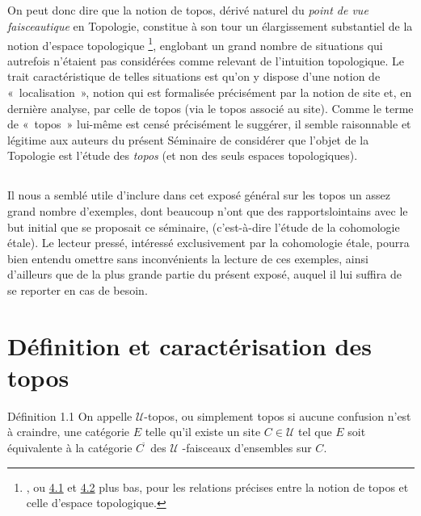 \documentclass[10pt]{../fichiers-configuration-latex/smfart}
\begin{document}
\subsection{}
On peut donc dire que la notion de topos, dérivé naturel du
\emph{point de vue faisceautique} en Topologie, constitue à son
tour un élargissement substantiel de la notion  d'espace
topologique \footnote[1]{\Cf [9], ou \hyperref[IV.subsec4.1]{4.1} et
\hyperref[IV.subsec4.2]{4.2} plus bas, pour les relations
  précises entre la notion de topos et celle d'espace
  topologique.}, englobant un grand nombre de situations qui
autrefois n'étaient pas considérées comme relevant de
l'intuition topologique. Le trait caractéristique de telles
situations est qu'on y dispose d'une notion de « localisation »,
notion qui est formalisée précisément par la notion de site
et, en dernière analyse, par celle de topos (via le topos
associé au site). Comme le terme de « topos »  lui-même est
censé précisément le suggérer, il semble raisonnable et
légitime aux auteurs du présent Séminaire de considérer que
l'objet de la Topologie est l'étude des \emph{topos} (et non des
seuls espaces topologiques).

\subsection{}
Il nous a semblé utile d'inclure dans cet exposé général sur
les topos un assez grand nombre d'exemples, dont beaucoup n'ont que
des rapports\pageoriginale lointains avec le but initial que se
proposait ce séminaire, (c'est-à-dire l'étude de la
cohomologie étale). Le lecteur pressé, intéressé
exclusivement par la cohomologie étale, pourra bien entendu
omettre sans inconvénients la lecture de ces exemples, ainsi
d'ailleurs que de la plus grande partie du présent exposé,
auquel il lui suffira de se reporter en cas de besoin.

\section{Définition et caractérisation des topos}

\begin{enonce*}{Définition 1.1}
On appelle $𝒰$-topos, ou simplement topos si aucune
confusion n'est à craindre, une catégorie $E$ telle qu'il existe
un site $C\in 𝒰$ tel que $E$ soit équivalente à la
catégorie $C^{\widetilde{\phantom{,}}}$ des $𝒰$ -faisceaux
d'ensembles sur $C$.
\end{enonce*}
\end{document}
